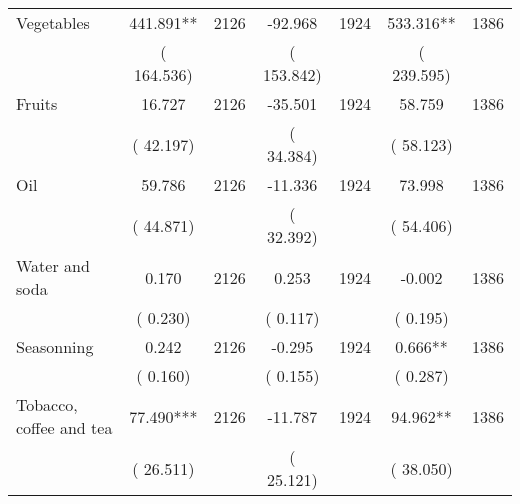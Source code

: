 \begin{tabular}{l*{6}{c}}
Vegetables        &            441.891**      &       2126       &            -92.968      &       1924       &            533.316**      &       1386       \\
                       &       (     164.536)            &                               &       (     153.842)            &                               &       (     239.595)            &                               \\
Fruits        &             16.727      &       2126       &            -35.501      &       1924       &             58.759      &       1386       \\
                       &       (      42.197)            &                               &       (      34.384)            &                               &       (      58.123)            &                               \\
Oil        &             59.786      &       2126       &            -11.336      &       1924       &             73.998      &       1386       \\
                       &       (      44.871)            &                               &       (      32.392)            &                               &       (      54.406)            &                               \\
Water and soda        &              0.170      &       2126       &              0.253      &       1924       &             -0.002      &       1386       \\
                       &       (       0.230)            &                               &       (       0.117)            &                               &       (       0.195)            &                               \\
Seasonning        &              0.242      &       2126       &             -0.295      &       1924       &              0.666**      &       1386       \\
                       &       (       0.160)            &                               &       (       0.155)            &                               &       (       0.287)            &                               \\
Tobacco, coffee and tea        &             77.490***      &       2126       &            -11.787      &       1924       &             94.962**      &       1386       \\
                       &       (      26.511)            &                               &       (      25.121)            &                               &       (      38.050)            &                               \\
\hline \end{tabular}